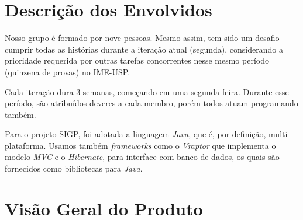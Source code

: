 \documentclass[11pt, a4paper]{article}
\begin{document}
    \section{Descrição dos Envolvidos}
        Nosso grupo é formado por nove pessoas. Mesmo assim, tem sido um desafio cumprir todas as histórias durante a iteração atual (segunda), considerando a prioridade requerida por outras tarefas concorrentes nesse mesmo período (quinzena de provas) no IME-USP. 

 Cada iteração dura 3 semanas, começando em uma segunda-feira. Durante esse período, são atribuídos deveres a cada membro, porém todos atuam programando também.

Para o projeto SIGP, foi adotada a linguagem \emph{Java}, que é, por definição, multi-plataforma. Usamos também \emph{frameworks} como o \emph{Vraptor} que implementa o modelo \emph{MVC} e o \emph{Hibernate}, para interface com banco de dados, os quais são fornecidos como bibliotecas para \emph{Java}.
    
    \section{Visão Geral do Produto}
\end{document}
